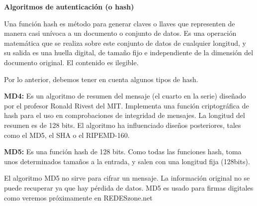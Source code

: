 \documentclass[12pt]{article}
\begin{document}
\vspace{\baselineskip}
\begin{justify}
\textbf{Algoritmos de autenticación (o hash)}
\end{justify}\par


\vspace{\baselineskip}
\begin{justify}
Una función hash es método para generar claves o llaves que representen de manera casi unívoca a un documento o conjunto de datos. Es una operación matemática que se realiza sobre este conjunto de datos de cualquier longitud, y su salida es una huella digital, de tamaño fijo e independiente de la dimensión del documento original. El contenido es ilegible.
\end{justify}\par


\vspace{\baselineskip}
\begin{justify}
Por lo anterior, debemos tener en cuenta algunos tipos de hash.
\end{justify}\par


\vspace{\baselineskip}
\begin{justify}
\textbf{MD4:} Es un algoritmo de resumen del mensaje (el cuarto en la serie) diseñado por el profesor Ronald Rivest del MIT. Implementa una función criptográfica de hash para el uso en comprobaciones de integridad de mensajes. La longitud del resumen es de 128 bits. El algoritmo ha influenciado diseños posteriores, tales como el MD5, el SHA o el RIPEMD-160.
\end{justify}\par


\vspace{\baselineskip}
\begin{justify}
\textbf{MD5:} Es una función hash de 128 bits. Como todas las funciones hash, toma unos determinados tamaños a la entrada, y salen con una longitud fija (128bits).
\end{justify}\par

\begin{justify}
El algoritmo MD5 no sirve para cifrar un mensaje. La información original no se puede recuperar ya que hay pérdida de datos. MD5 es usado para firmas digitales como veremos próximamente en REDESzone.net
\end{justify}\par
\end{document}
